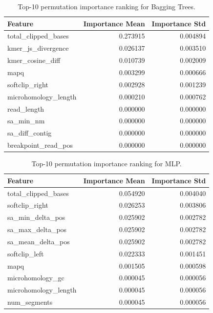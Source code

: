 \begin{table}[H]
\centering
\small
\caption{Top-10 permutation importance ranking for Bagging Trees.}
\label{tab:imp_bagging}
\begin{tabular}{lrr}
\toprule
Feature & Importance Mean & Importance Std \\
\midrule
total\_clipped\_bases & 0.273915 & 0.004894 \\
kmer\_js\_divergence & 0.026137 & 0.003510 \\
kmer\_cosine\_diff & 0.010739 & 0.002009 \\
mapq & 0.003299 & 0.000666 \\
softclip\_right & 0.002928 & 0.001239 \\
microhomology\_length & 0.000210 & 0.000762 \\
read\_length & 0.000000 & 0.000000 \\
sa\_min\_nm & 0.000000 & 0.000000 \\
sa\_diff\_contig & 0.000000 & 0.000000 \\
breakpoint\_read\_pos & 0.000000 & 0.000000 \\
\bottomrule
\end{tabular}
\end{table}

\begin{table}[H]
\centering
\small
\caption{Top-10 permutation importance ranking for MLP.}
\label{tab:imp_mlp}
\begin{tabular}{lrr}
\toprule
Feature & Importance Mean & Importance Std \\
\midrule
total\_clipped\_bases & 0.054920 & 0.004040 \\
softclip\_right & 0.026253 & 0.003806 \\
sa\_min\_delta\_pos & 0.025902 & 0.002782 \\
sa\_max\_delta\_pos & 0.025902 & 0.002782 \\
sa\_mean\_delta\_pos & 0.025902 & 0.002782 \\
softclip\_left & 0.022333 & 0.001451 \\
mapq & 0.001505 & 0.000598 \\
microhomology\_gc & 0.000045 & 0.000056 \\
microhomology\_length & 0.000045 & 0.000056 \\
num\_segments & 0.000045 & 0.000056 \\
\bottomrule
\end{tabular}
\end{table}

